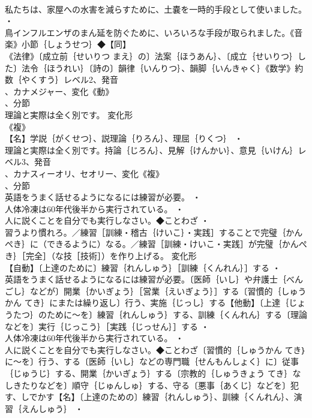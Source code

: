 \documentclass[8pt]{extreport}
\begin{document}
\begin{CJK}{UTF8}{min}
\\	私たちは、家屋への水害を減らすために、土嚢を一時的手段として使いました。 ・
\\	鳥インフルエンザのまん延を防ぐために、いろいろな手段が取られました。《音楽》小節｛しょうせつ｝◆【同】
\\	《法律》〔成立前｛せいりつ まえ｝の〕法案｛ほうあん｝、〔成立｛せいりつ｝した〕法令｛ほうれい｝〔詩の〕韻律｛いんりつ｝、韻脚｛いんきゃく｝《数学》約数｛やくすう｝レベル2、発音
\\	、カナメジャー、変化《動》
\\	、分節
\\	理論と実際は全く別です。	変化形 
\\	《複》
\\	【名】学説｛がくせつ｝、説理論｛りろん｝、理屈｛りくつ｝ ・
\\	理論と実際は全く別です。持論｛じろん｝、見解｛けんかい｝、意見｛いけん｝レベル3、発音
\\	、カナスィーオリ、セオリー、変化《複》
\\	、分節
\\	英語をうまく話せるようになるには練習が必要。 ・
\\	人体冷凍は60年代後半から実行されている。 ・
\\	人に説くことを自分でも実行しなさい。◆ことわざ ・
\\	習うより慣れろ。／練習［訓練・稽古｛けいこ｝・実践］することで完璧｛かんぺき｝に（できるように）なる。／練習［訓練・けいこ・実践］が完璧｛かんぺき｝［完全］（な技［技術］）を作り上げる。	変化形 
\\	【自動】〔上達のために〕練習｛れんしゅう｝［訓練｛くんれん｝］する ・
\\	英語をうまく話せるようになるには練習が必要。〔医師｛いし｝や弁護士｛べんごし｝などが〕開業｛かいぎょう｝［営業｛えいぎょう｝］する〔習慣的｛しゅうかん てき｝にまたは繰り返し〕行う、実施｛じっし｝する【他動】〔上達｛じょうたつ｝のために～を〕練習｛れんしゅう｝する、訓練｛くんれん｝する〔理論などを〕実行｛じっこう｝［実践｛じっせん｝］する ・
\\	人体冷凍は60年代後半から実行されている。 ・
\\	人に説くことを自分でも実行しなさい。◆ことわざ〔習慣的｛しゅうかん てき｝に～を〕行う、する〔医師｛いし｝などの専門職｛せんもんしょく｝に〕従事｛じゅうじ｝する、開業｛かいぎょう｝する〔宗教的｛しゅうきょう てき｝なしきたりなどを〕順守｛じゅんしゅ｝する、守る〔悪事｛あくじ｝などを〕犯す、しでかす【名】〔上達のための〕練習｛れんしゅう｝、訓練｛くんれん｝、演習｛えんしゅう｝ ・

\end{CJK}
\end{document}
